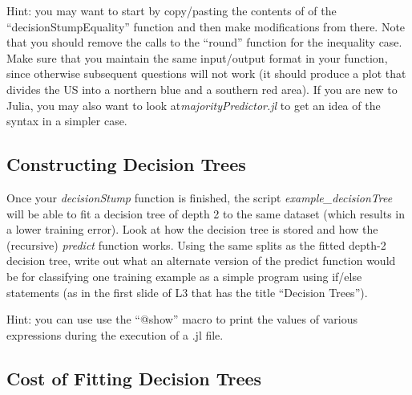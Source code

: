 \documentclass{article}
\def\blu#1{{\color{blu}#1}}
\begin{document}
Hint: you may want to start by copy/pasting the contents of of the ``decisionStumpEquality'' function and then make modifications from there. Note that you should remove the calls to the ``round'' function for the inequality case.  Make sure that you maintain the same input/output format in your function, since otherwise subsequent questions will not work (it should produce a plot that divides the US into a northern blue and a southern red area).
If you are new to Julia, you may also want to look at\emph{majorityPredictor.jl} to get an idea of the syntax in  a simpler case.

\subsection{Constructing Decision Trees}

Once your \emph{decisionStump} function is finished, the script \emph{example\_decisionTree} will be able to fit a decision tree of depth 2 to the same dataset (which results in a lower training error). Look at how the decision tree is stored and how the (recursive) \emph{predict} function works. \blu{Using the same splits as the fitted depth-2 decision tree, write out what an alternate version of the predict function would be for classifying one training example as a simple program using if/else statements (as in the first slide of L3 that has the title ``Decision Trees'').}

Hint: you can use use the ``@show'' macro to print the values of various expressions during the execution of a .jl file.

\subsection{Cost of Fitting Decision Trees}
\end{document}
